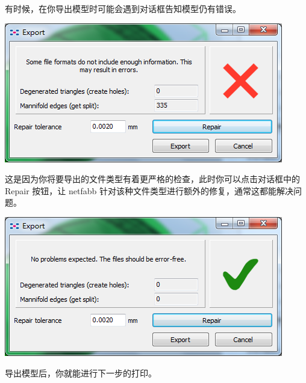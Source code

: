 \documentclass[10pt,a4paper]{article}
\begin{document}
\begin{CJK*}{UTF8}{song}
有时候，在你导出模型时可能会遇到对话框告知模型仍有错误。

\includegraphics[width=0.7\linewidth]{exportRepair}

这是因为你将要导出的文件类型有着更严格的检查，此时你可以点击对话框中的 Repair 按钮，让 netfabb 针对该种文件类型进行额外的修复，通常这都能解决问题。

\includegraphics[width=0.7\linewidth]{exportDone}

导出模型后，你就能进行下一步的打印。
\newpage

\end{CJK*}
\end{document}
